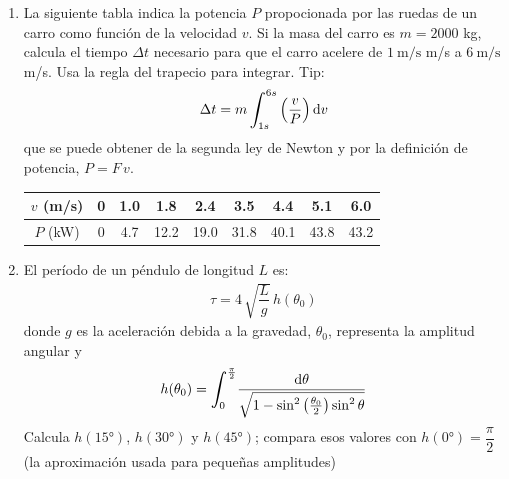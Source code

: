 \begin{enumerate}
\item La siguiente tabla indica la potencia $P$ propocionada por las ruedas de un carro como función de la velocidad $v$. Si la masa del carro es $m = 2000$ kg, calcula el tiempo $\Delta t$ necesario para que el carro acelere de $\SI{1}{\meter\per\second}$ m/s a $\SI{6}{\meter\per\second}$ m/s. Usa la regla del trapecio para integrar. Tip:
\begin{align*}
\Delta t = m \, \scaleint{6ex}_{\bs 1s}^{6s} \left( \dfrac{v}{P} \right) \dd{v}
\end{align*}
que se puede obtener de la segunda ley de Newton y por la definición de potencia, $P = F \, v$.
\begin{center}
\begin{tabular}{c | c | c | c | c | c | c | c | c}
$v$ (m/s) & 0 & 1.0 & 1.8 & 2.4 & 3.5 & 4.4 & 5.1 & 6.0 \\ \hline
$P$ (kW)  & 0 & 4.7 & 12.2 & 19.0 & 31.8 & 40.1 & 43.8 & 43.2 
\end{tabular}
\end{center}
\item El período de un péndulo de longitud $L$ es:
\begin{align*}
\tau = 4 \, \sqrt{\dfrac{L}{g}} \, h(\theta_{0})
\end{align*}
donde $g$ es la aceleración debida a la gravedad, $\theta_{0}$, representa la amplitud angular y 
\begin{align*}
h (\theta_{0}) =  \scaleint{6ex}_{\bs 0}^{\frac{\pi}{2}} \dfrac{\dd{\theta}}{\sqrt{1 - \sin^{2} \left( \frac{\theta_{0}}{2}\right) \sin^{2} \theta}}
\end{align*}
Calcula $h (\ang{15})$, $h (\ang{30})$ y $h (\ang{45})$; compara esos valores con $h (\ang{0}) = \dfrac{\pi}{2}$ (la aproximación usada para pequeñas amplitudes)

\end{enumerate}



